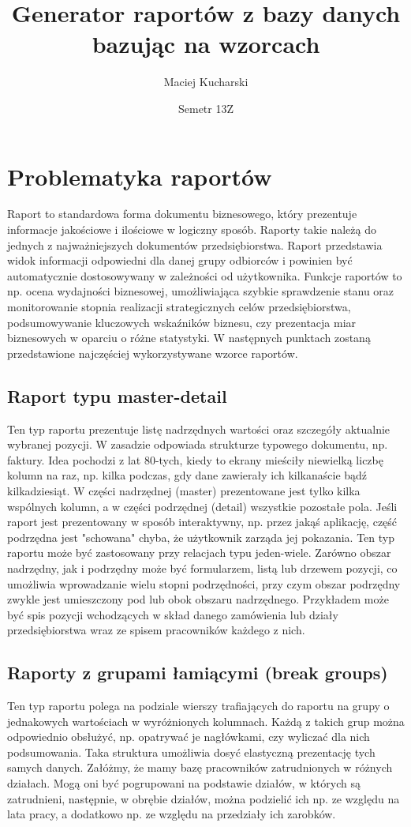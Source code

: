 \documentclass[11pt,a4paper]{article}
\title{Generator raportów z bazy danych bazując na wzorcach}
\author{Maciej Kucharski}
\date{Semetr 13Z}
\begin{document}
\maketitle
 
\section{Problematyka raportów}\label{sec:raport}
Raport to standardowa forma dokumentu biznesowego, który prezentuje informacje jakościowe i ilościowe w logiczny sposób. Raporty takie należą do jednych z najważniejszych dokumentów przedsiębiorstwa. Raport przedstawia widok informacji odpowiedni dla danej grupy odbiorców i powinien być automatycznie dostosowywany w zależności od użytkownika. Funkcje raportów to np.
ocena wydajności biznesowej, umożliwiająca szybkie sprawdzenie stanu oraz monitorowanie stopnia realizacji strategicznych celów przedsiębiorstwa, podsumowywanie kluczowych wskaźników biznesu, czy prezentacja miar biznesowych w oparciu o różne statystyki. W następnych punktach zostaną przedstawione najczęściej wykorzystywane wzorce raportów.
\subsection{Raport typu master-detail}\label{sec:master_detail}
Ten typ raportu prezentuje listę nadrzędnych wartości oraz szczegóły aktualnie wybranej pozycji. W zasadzie odpowiada strukturze typowego dokumentu, np. faktury. Idea pochodzi z lat 80-tych, kiedy to ekrany mieściły niewielką liczbę kolumn na raz, np. kilka podczas, gdy dane zawierały ich kilkanaście bądź kilkadziesiąt. W części nadrzędnej (master) prezentowane jest tylko kilka wspólnych kolumn, a w części podrzędnej (detail) wszystkie pozostałe pola. Jeśli raport jest prezentowany w sposób interaktywny, np. przez jakąś aplikację, część podrzędna jest "schowana" chyba, że użytkownik zarząda jej pokazania. Ten typ raportu może być zastosowany przy relacjach typu jeden-wiele. Zarówno obszar nadrzędny, jak i podrzędny może być formularzem, listą lub drzewem pozycji, co umożliwia wprowadzanie wielu stopni podrzędności, przy czym obszar podrzędny zwykle jest umieszczony pod lub obok obszaru nadrzędnego. Przykładem może być spis pozycji wchodzących w skład danego zamówienia lub działy przedsiębiorstwa wraz ze spisem pracowników każdego z nich.
\subsection{Raporty z grupami łamiącymi (break groups)}\label{sec:break_groups}
Ten typ raportu polega na podziale wierszy trafiających do raportu na grupy o jednakowych wartościach w wyróżnionych kolumnach. Każdą z takich grup można odpowiednio obsłużyć, np. opatrywać je nagłówkami, czy wyliczać dla nich podsumowania. Taka struktura umożliwia dosyć elastyczną prezentację tych samych danych. Załóżmy, że mamy bazę pracowników zatrudnionych w różnych działach. Mogą oni być pogrupowani na podstawie działów, w których są zatrudnieni, następnie, w obrębie działów, można podzielić ich np. ze względu na lata pracy, a dodatkowo np. ze względu na przedziały ich zarobków. 
\end{document}
